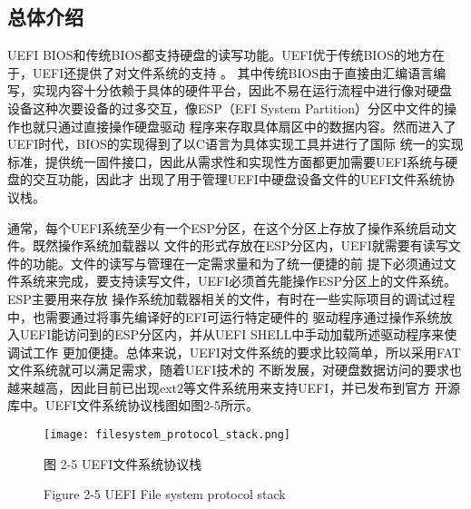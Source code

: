 \subsection{总体介绍}
UEFI BIOS和传统BIOS都支持硬盘的读写功能。UEFI优于传统BIOS的地方在于，UEFI还提供了对文件系统的支持
\cite{english18}。
其中传统BIOS由于直接由汇编语言编写，实现内容十分依赖于具体的硬件平台，因此不易在运行流程中进行像对硬盘
设备这种次要设备的过多交互，像ESP（EFI System Partition）分区中文件的操作也就只通过直接操作硬盘驱动
程序来存取具体扇区中的数据内容。然而进入了UEFI时代，BIOS的实现得到了以C语言为具体实现工具并进行了国际
统一的实现标准，提供统一固件接口，因此从需求性和实现性方面都更加需要UEFI系统与硬盘的交互功能，因此才
出现了用于管理UEFI中硬盘设备文件的UEFI文件系统协议栈。
\par 通常，每个UEFI系统至少有一个ESP分区，在这个分区上存放了操作系统启动文件。既然操作系统加载器以
文件的形式存放在ESP分区内，UEFI就需要有读写文件的功能。文件的读写与管理在一定需求量和为了统一便捷的前
提下必须通过文件系统来完成，要支持读写文件，UEFI必须首先能操作ESP分区上的文件系统。ESP主要用来存放
操作系统加载器相关的文件，有时在一些实际项目的调试过程中，也需要通过将事先编译好的EFI可运行特定硬件的
驱动程序通过操作系统放入UEFI能访问到的ESP分区内，并从UEFI SHELL中手动加载所述驱动程序来使调试工作
更加便捷。总体来说，UEFI对文件系统的要求比较简单，所以采用FAT文件系统就可以满足需求，随着UEFI技术的
不断发展，对硬盘数据访问的要求也越来越高，因此目前已出现ext2等文件系统用来支持UEFI，并已发布到官方
开源库中。UEFI文件系统协议栈图如图2-5所示。

\begin{figure}[htb]
    \vspace{0cm}   
    \setlength{\abovecaptionskip}{0.3cm}  
	\centering
    \texttt{[image: filesystem\_protocol\_stack.png]}
    \caption*{图 2-5 UEFI文件系统协议栈}
    \setlength{\belowcaptionskip}{-0.7cm}
    \caption*{Figure 2-5 UEFI File system protocol stack}
\end{figure}

